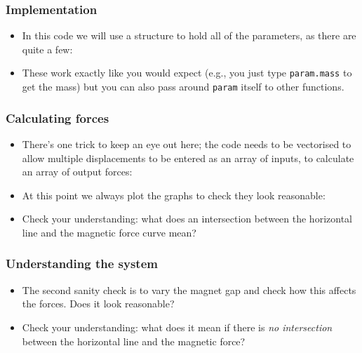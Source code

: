 \documentclass[9pt]{beamer-control}
\begin{document}
\begin{frame}
  \frametitle{Implementation}

  \begin{itemize}
    \item In this code we will use a structure to hold all of the parameters, as there are quite a few:
  \end{itemize}


  \begin{itemize}
    \item These work exactly like you would expect (e.g., you just type \texttt{param.mass} to get the mass) but you can also pass around \texttt{param} itself to other functions.
  \end{itemize}

\end{frame}

\begin{frame}

  \frametitle{Calculating forces}

  \begin{itemize}
    \item There's one trick to keep an eye out here; the code needs to be vectorised to allow multiple displacements to be entered as an array of inputs, to calculate an array of  output forces:
  \end{itemize}


  \begin{itemize}
    \item At this point we always plot the graphs to check they look reasonable:
  \end{itemize}


  \begin{itemize}
    \item Check your understanding: what does an intersection between the horizontal line and the magnetic force curve mean?
  \end{itemize}

\end{frame}

\begin{frame}
  \frametitle{Understanding the system}

  \begin{itemize}
    \item The second sanity check is to vary the magnet gap and check how this affects the forces. Does it look reasonable?
  \end{itemize}


  \begin{itemize}
    \item Check your understanding: what does it mean if there is \emph{no intersection} between the horizontal line and the magnetic force?
  \end{itemize}

\end{frame}
\end{document}
